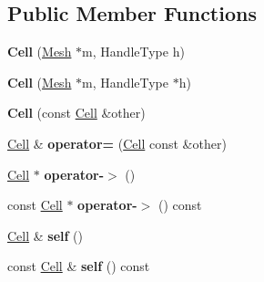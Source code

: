\subsection*{Public Member Functions}
\begin{DoxyCompactItemize}
\item 
\hypertarget{classINMOST_1_1Cell_a6a5d747177264baf51981526d687160e}{{\bfseries Cell} (\hyperlink{classINMOST_1_1Mesh}{Mesh} $\ast$m, Handle\-Type h)}\label{classINMOST_1_1Cell_a6a5d747177264baf51981526d687160e}

\item 
\hypertarget{classINMOST_1_1Cell_a3775295eb0087a53085e760ef15f7a5e}{{\bfseries Cell} (\hyperlink{classINMOST_1_1Mesh}{Mesh} $\ast$m, Handle\-Type $\ast$h)}\label{classINMOST_1_1Cell_a3775295eb0087a53085e760ef15f7a5e}

\item 
\hypertarget{classINMOST_1_1Cell_a2caed8dde9efdcd45bbab752beb1bc48}{{\bfseries Cell} (const \hyperlink{classINMOST_1_1Cell}{Cell} \&other)}\label{classINMOST_1_1Cell_a2caed8dde9efdcd45bbab752beb1bc48}

\item 
\hypertarget{classINMOST_1_1Cell_a42506f458c54cc177a56444d88b01770}{\hyperlink{classINMOST_1_1Cell}{Cell} \& {\bfseries operator=} (\hyperlink{classINMOST_1_1Cell}{Cell} const \&other)}\label{classINMOST_1_1Cell_a42506f458c54cc177a56444d88b01770}

\item 
\hypertarget{classINMOST_1_1Cell_a56ea16402b10b39c53c7c0fbc60ef748}{\hyperlink{classINMOST_1_1Cell}{Cell} $\ast$ {\bfseries operator-\/$>$} ()}\label{classINMOST_1_1Cell_a56ea16402b10b39c53c7c0fbc60ef748}

\item 
\hypertarget{classINMOST_1_1Cell_a2f1b082d4303e9a36dcd7f37abf16698}{const \hyperlink{classINMOST_1_1Cell}{Cell} $\ast$ {\bfseries operator-\/$>$} () const }\label{classINMOST_1_1Cell_a2f1b082d4303e9a36dcd7f37abf16698}

\item 
\hypertarget{classINMOST_1_1Cell_ae7b259720c92912e8d267220f79e1ab5}{\hyperlink{classINMOST_1_1Cell}{Cell} \& {\bfseries self} ()}\label{classINMOST_1_1Cell_ae7b259720c92912e8d267220f79e1ab5}

\item 
\hypertarget{classINMOST_1_1Cell_ac283b04a07fdacfba61054cfc054f7bf}{const \hyperlink{classINMOST_1_1Cell}{Cell} \& {\bfseries self} () const }\label{classINMOST_1_1Cell_ac283b04a07fdacfba61054cfc054f7bf}


\end{DoxyCompactItemize}

